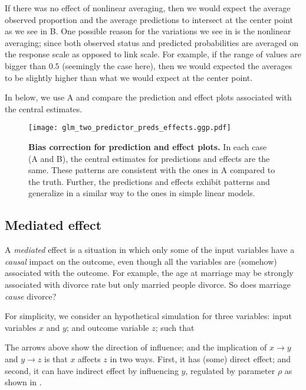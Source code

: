If there was no effect of nonlinear averaging, then we would expect the average observed proportion and the average predictions to intersect at the center point as we see in B. One possible reason for the variations we see in  is the nonlinear averaging; since both observed status and predicted probabilities are averaged on the response scale as opposed to link scale. For example, if the range of values are bigger than $0.5$ (seemingly the case here), then we would expected the averages to be slightly higher than what we would expect at the center point.

In  below, we use A and compare the prediction and effect plots associated with the central estimates. 

\begin{figure}
\begin{center}
\texttt{[image: glm\_two\_predictor\_preds\_effects.ggp.pdf]}
\end{center}
\caption{{\bf Bias correction for prediction and effect plots.} In each case (A and B), the central estimates for predictions and effects are the same. These patterns are  consistent with the ones in A compared to the truth. Further, the predictions and effects exhibit patterns and generalize in a similar way to the ones in simple linear models.
}
\label{fig:pred_bin_prediction_effects_plots}
\end{figure}


\subsection{Mediated effect}

A \emph{mediated} effect is a situation in which only some of the input variables have a \emph{causal} impact on the outcome, even though all the variables are (somehow) associated with the outcome. For example, the age at marriage may be strongly associated with divorce rate but only married people divorce. So does marriage \emph{cause} divorce?

For simplicity, we consider an hypothetical simulation for three variables: input variables $x$ and $y$; and outcome variable $z$; such that
%
\begin{center}
\end{center}
%
The arrows above show the direction of influence; and the implication of $x\rightarrow y$ and $y \rightarrow z$ is that $x$ affects $z$ in two ways. First, it has (some) direct effect; and second, it can have indirect effect by influencing $y$, regulated by parameter $\rho$ as shown in .

